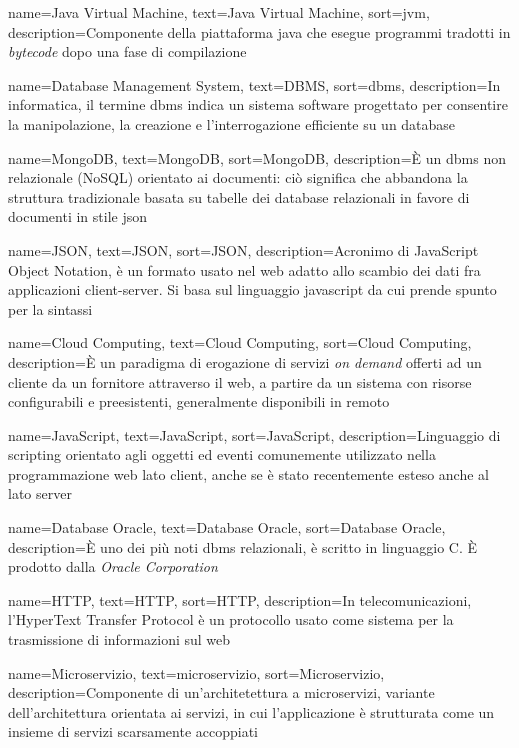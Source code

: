 {
    name=Java Virtual Machine,
    text=Java Virtual Machine,
    sort=jvm,
    description={Componente della piattaforma \gls{java} che esegue programmi tradotti in \emph{bytecode} dopo una fase di compilazione}
}

{
    name=Database Management System,
    text=DBMS,
    sort=dbms,
    description={In informatica, il termine \gls{dbms} indica un sistema software progettato per consentire la manipolazione, la creazione e l'interrogazione efficiente su un database}
}

{
    name=MongoDB,
    text=MongoDB,
    sort=MongoDB,
    description={È un \gls{dbms} non relazionale (NoSQL) orientato ai documenti: ciò significa che abbandona la struttura tradizionale basata su tabelle dei database relazionali in favore di documenti in stile \gls{json}}
}

{
    name=JSON,
    text=JSON,
    sort=JSON,
    description={Acronimo di JavaScript Object Notation, è un formato usato nel web adatto allo scambio dei dati fra applicazioni client-server. Si basa sul linguaggio \gls{javascript} da cui prende spunto per la sintassi}
}

{
    name=Cloud Computing,
    text=Cloud Computing,
    sort=Cloud Computing,
    description={È un paradigma di erogazione di servizi \emph{on demand} offerti ad un cliente da un fornitore attraverso il web, a partire da
    un sistema con risorse configurabili e preesistenti, generalmente disponibili in remoto}
}

{
    name=JavaScript,
    text=JavaScript,
    sort=JavaScript,
    description={Linguaggio di scripting orientato agli oggetti ed eventi comunemente utilizzato nella programmazione web lato client, anche se è stato recentemente esteso anche al lato server}
}

{
    name=Database Oracle,
    text=Database Oracle,
    sort=Database Oracle,
    description={È uno dei più noti \gls{dbms} relazionali, è scritto in linguaggio C. È prodotto dalla \emph{Oracle Corporation}}
}

{
    name=HTTP,
    text=HTTP,
    sort=HTTP,
    description={In telecomunicazioni, l'HyperText Transfer Protocol è un protocollo usato come sistema per la trasmissione di informazioni sul web}
}

{
    name=Microservizio,
    text=microservizio,
    sort=Microservizio,
    description={Componente di un'architetettura a microservizi, variante dell'architettura orientata ai servizi, in cui l'applicazione è strutturata come un insieme di servizi scarsamente accoppiati}
}

